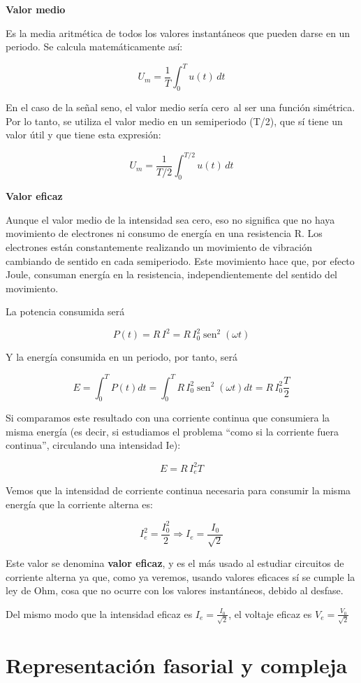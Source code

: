 \documentclass[
  a4paper,
  DIV=11,
  numbers=noendperiod]{scrreprt}
\newcommand{\sen}{\operatorname{sen}}
\begin{document}
\textbf{Valor medio}

Es la media aritmética de todos los valores instantáneos que pueden
darse en un periodo. Se calcula matemáticamente así:

\[U_m = \frac{1}{T} \int_0^T u(t)\,dt\]

En el caso de la señal seno, el valor medio sería cero~al ser una
función simétrica. Por lo tanto, se utiliza el valor medio en un
semiperiodo (T/2), que sí tiene un valor útil y que tiene esta
expresión:

\[U_m = \frac{1}{T/2} \int_0^{T/2} u(t)\,dt\]

\textbf{Valor eficaz}

Aunque el valor medio de la intensidad sea cero, eso no significa que no
haya movimiento de electrones ni consumo de energía en una resistencia
R. Los electrones están constantemente realizando un movimiento de
vibración cambiando de sentido en cada semiperiodo. Este movimiento hace
que, por efecto Joule, consuman energía en la resistencia,
independientemente del sentido del movimiento.

La potencia consumida será

\[P(t) = R\,I^2 = R\,I_0^2\sen^2(\omega t)\]

Y la energía consumida en un periodo, por tanto, será

\[E = \int_{0}^{T}P(t)dt= \int_{0}^{T} R\,I_0^2\sen^2(\omega t) dt=R\,I_0^2\frac{T}{2}\]

Si comparamos este resultado con una corriente continua que consumiera
la misma energía (es decir, si estudiamos el problema ``como si la
corriente fuera continua'', circulando una intensidad Ie):

\[E = R\,I_e^2T\]

Vemos que la intensidad de corriente continua necesaria para consumir la
misma energía que la corriente alterna es:

\[I_{e}^{2}=\frac{I_{0}^{2}}{2}\Rightarrow I_{e}=\frac{I_{0}}{\sqrt{2}}\]

Este valor se denomina \textbf{valor eficaz}, y es el más usado al
estudiar circuitos de corriente alterna ya que, como ya veremos, usando
valores eficaces sí se cumple la ley de Ohm, cosa que no ocurre con los
valores instantáneos, debido al desfase.

Del mismo modo que la intensidad eficaz es
\(I_{e}=\frac{I_{0}}{\sqrt{2}}\), el voltaje eficaz es
\(V_{e}=\frac{V_{0}}{\sqrt{2}}\)

\section{Representación fasorial y
compleja}\label{representaciuxf3n-fasorial-y-compleja}
\end{document}
